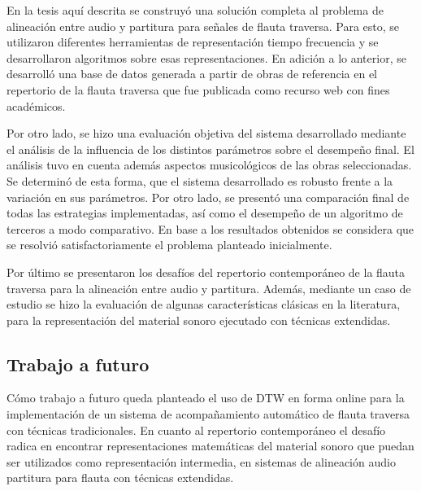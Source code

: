 \documentclass
  [ams,pdfout]%
	{aeslac}
\begin{document}
En la tesis aquí descrita se construyó una solución completa al problema de alineación entre audio y partitura para señales de flauta traversa. Para esto, se utilizaron diferentes herramientas de representación tiempo frecuencia y se desarrollaron algoritmos sobre esas representaciones. En adición a lo anterior, se desarrolló una base de datos generada a partir de obras de referencia en el repertorio de la flauta traversa que fue publicada como recurso web con fines académicos.

Por otro lado, se hizo una evaluación objetiva del sistema desarrollado mediante el análisis de la influencia de los distintos parámetros sobre el desempeño final. El análisis tuvo en cuenta además aspectos musicológicos de las obras seleccionadas. Se determinó de esta forma, que el sistema desarrollado es robusto frente a la variación en sus parámetros. Por otro lado, se presentó una comparación final de todas las estrategias implementadas, así como el desempeño de un algoritmo de terceros a modo comparativo. En base a los resultados obtenidos se considera que se resolvió satisfactoriamente el problema planteado inicialmente.

Por último se presentaron los desafíos del repertorio contemporáneo de la flauta traversa para la alineación entre audio y partitura. Además, mediante un caso de estudio se hizo la evaluación de algunas características clásicas en la literatura, para la representación del material sonoro ejecutado con técnicas extendidas.

\subsection{Trabajo a futuro}

Cómo trabajo a futuro queda planteado el uso de DTW en forma online para la implementación de un sistema de acompañamiento automático de flauta traversa con técnicas tradicionales. En cuanto al repertorio contemporáneo el desafío radica en encontrar representaciones matemáticas del material sonoro que puedan ser utilizados como representación intermedia, en sistemas de alineación audio partitura para flauta con técnicas extendidas. 

%
%
%
\end{document}
